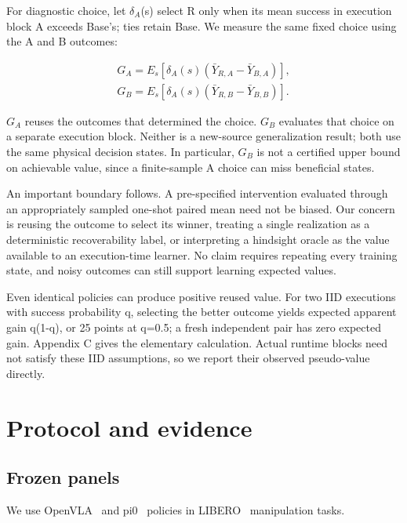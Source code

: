 For diagnostic choice, let $\delta_A$(s) select R only when its mean success in execution block A exceeds Base's; ties retain Base. We measure the same fixed choice using the A and B outcomes:


\begin{equation}\begin{gathered}G_A=E_s[\delta_A(s)(\bar Y_{R,A}-\bar Y_{B,A})],\\ G_B=E_s[\delta_A(s)(\bar Y_{R,B}-\bar Y_{B,B})].\end{gathered}\end{equation}

$G_A$ reuses the outcomes that determined the choice. $G_B$ evaluates that choice on a separate execution block. Neither is a new-source generalization result; both use the same physical decision states. In particular, $G_B$ is not a certified upper bound on achievable value, since a finite-sample A choice can miss beneficial states.


An important boundary follows. A pre-specified intervention evaluated through an appropriately sampled one-shot paired mean need not be biased. Our concern is reusing the outcome to select its winner, treating a single realization as a deterministic recoverability label, or interpreting a hindsight oracle as the value available to an execution-time learner. No claim requires repeating every training state, and noisy outcomes can still support learning expected values.


Even identical policies can produce positive reused value. For two IID executions with success probability q, selecting the better outcome yields expected apparent gain q(1-q), or 25 points at q=0.5; a fresh independent pair has zero expected gain. Appendix C gives the elementary calculation. Actual runtime blocks need not satisfy these IID assumptions, so we report their observed pseudo-value directly.


\section{Protocol and evidence}

\subsection{Frozen panels}

We use OpenVLA~\citep{kim2024openvla} and pi0~\citep{black2024pi0} policies in LIBERO~\citep{liu2023libero} manipulation tasks.



